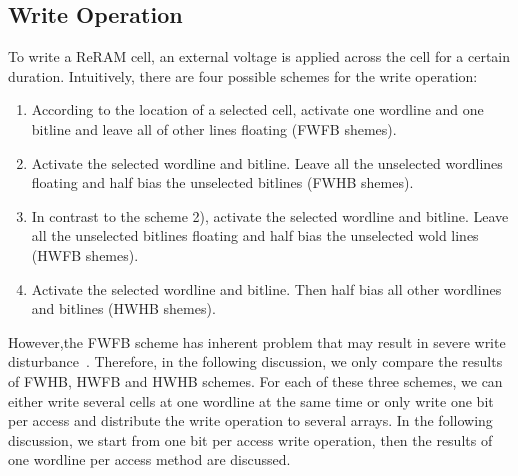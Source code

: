 \subsection{Write Operation}
To write a ReRAM cell, an external voltage is applied across the cell for
a certain duration. Intuitively, there are four possible schemes for the
write operation:
\begin{enumerate}
  \item According to the location of a selected cell, activate one wordline and one bitline and leave all of other lines floating (FWFB shemes).
  \item Activate the selected wordline and bitline. Leave all the unselected wordlines floating and half bias the unselected bitlines (FWHB shemes).
  \item In contrast to the scheme 2), activate the selected wordline and bitline. Leave all the unselected bitlines floating and half bias the unselected wold lines (HWFB shemes).
  \item Activate the selected wordline and bitline. Then half bias all other wordlines and bitlines (HWHB shemes).
\end{enumerate}
However,the FWFB scheme has inherent problem that may result in severe
write disturbance~\cite{??}. Therefore, in the following discussion, we
only compare the results of FWHB, HWFB and HWHB schemes. For each of these
three schemes, we can either write several cells at one wordline at the
same time or only write one bit per access and distribute the write
operation to several arrays. In the following discussion, we start from
one bit per access write operation, then the results of one wordline per
access method are discussed.

